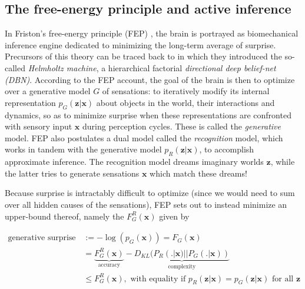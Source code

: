 \documentclass[10pt,letterpaper]{article}
\def\z{\mathbf{z}}
\def\x{\mathbf{x}}
\begin{document}
\subsection{The free-energy principle and active inference}
In Friston's free-energy principle (FEP) \citep{friston2010free,fristonAIorRL}, the brain is portrayed
as biomechanical inference engine
dedicated to minimizing the long-term average of surprise.
Precursors of this theory can be traced back to \citep{dayan1995helmholtz} in which they introduced the so-called \textit{Helmholtz machine}, a hierarchical factorial \textit{directional deep belief-net (DBN)}. According to the FEP account,
the goal of the brain is then to optimize over a generative model $G$ of sensations: to iteratively
modify its internal representation $p_G(\z|\x)$ about objects in the world, their interactions and dynamics,
so as to minimize surprise when these representations are confronted with sensory input $\x$ during perception cycles. These is called the \textit{generative} model. FEP also postulates a dual model called the \textit{recognition} model,
which works in tandem with the generative model $p_R(\z|\x)$, to accomplish approximate inference. The recognition model dreams imaginary worlds $\z$,
while the latter tries to generate sensations $\x$ which match these dreams!

Because surprise is intractably difficult to optimize (since we would need to sum over all hidden causes of the sensations), FEP sets out to instead minimize an upper-bound thereof,
namely the  $F_G^R(\x)$ given by

  \begin{equation}
    \begin{split}
      \text{generative surprise } &:= -\log(p_G(\x)) = F_G(\x) \\
      &=\underbrace{F^R_G(\x)}_{\text{accuracy}} - \underbrace{D_{KL}(P_R(.|\x) || P_G(.|\x))}_{\text{complexity}} \\
      &\le F^R_G(\x),
      \text{ with equality if }p_R(\z|\x) = p_G(\z|\x)\text{ for all } \z
    \end{split}
  \end{equation}
\end{document}
